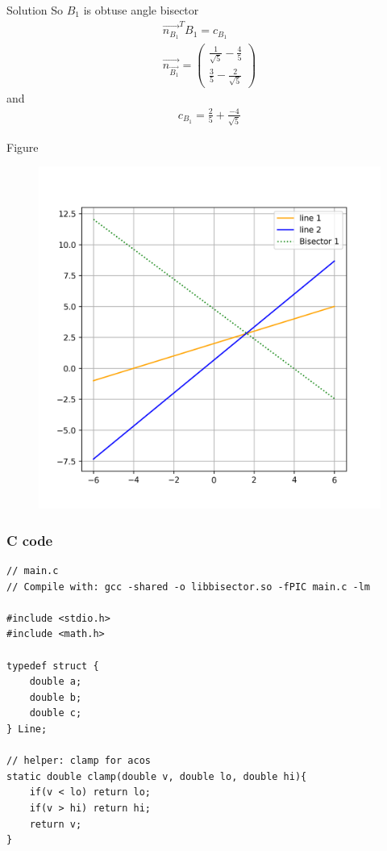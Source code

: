 \documentclass{beamer}
\begin{document}
\begin{frame}{Solution}
So $B_1$ is obtuse angle bisector
\begin{align}
\vec{n_{B_1}}^TB_1=c_{B_1}\\
\vec{n_{\vec{B_1}}}= \begin{pmatrix}\frac{1}{\sqrt{5}}-\frac{4}{5}\\ \frac{3}{5}-\frac{2}{\sqrt{5}} \end{pmatrix}
\end{align}
and
\begin{align}
    c_{B_1}=\frac{2}{5}+\frac{-4}{\sqrt{5}}
\end{align}
\end{frame}
\begin{frame}{Figure}
    \begin{figure}
        \centering
        \includegraphics[width=0.7\columnwidth]{figs/figure.png}
        \caption{}
        \label{fig:placeholder}
    \end{figure}
\end{frame}
\begin{frame}[fragile]
\frametitle{C code}
\begin{lstlisting}
// main.c
// Compile with: gcc -shared -o libbisector.so -fPIC main.c -lm

#include <stdio.h>
#include <math.h>

typedef struct {
    double a;
    double b;
    double c;
} Line;

// helper: clamp for acos
static double clamp(double v, double lo, double hi){
    if(v < lo) return lo;
    if(v > hi) return hi;
    return v;
}
\end{lstlisting}
\end{frame}
\end{document}
